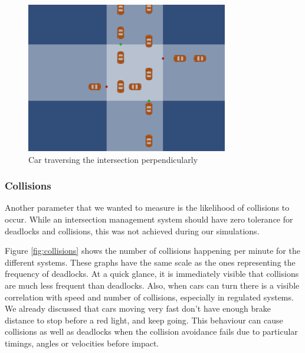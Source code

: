 \begin{figure}
\centering
\includegraphics[scale=0.65]{img/deadlock-start-str}
\caption{Car traversing the intersection perpendicularly} 
\label{fig:dead-start}
\end{figure}


\subsubsection{Collisions}
Another parameter that we wanted to measure is the likelihood of collisions to occur.
While an intersection management system should have zero tolerance for deadlocks and collisions, this was not achieved during our simulations.

Figure \ref{fig:collisions} shows the number of collisions happening per minute for the different systems.
These graphs have the same scale as the ones representing the frequency of deadlocks.
At a quick glance, it is immediately visible that collisions are much less frequent than deadlocks.
Also, when cars can turn there is a visible correlation with speed and number of collisions, especially in regulated systems.
We already discussed that cars moving very fast don't have enough brake distance to stop before a red light, and keep going.
This behaviour can cause collisions as well as deadlocks when the collision avoidance fails due to particular timings, angles or velocities before impact.


